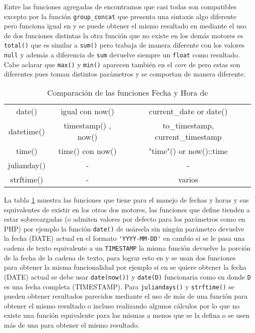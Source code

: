 Entre las funciones agregadas de \s encontramos que casi todas son compatibles excepto por la función \verb=group_concat= que presenta una sintaxis algo diferente pero funciona igual en \m y se puede obtener el mismo resultado en \p mediante el uso de dos funciones distintas la otra función que no existe en los demás motores es \verb=total()= que es similar a \verb=sum()= pero  trabaja de manera diferente con los valores \verb=null= y además a diferencia de \verb=sum= devuelve siempre un \verb=float= como resultado. Cabe aclarar que \verb=max()= y \verb=min()= aparecen también en el \textit{core} de \s pero estas son diferentes pues toman distintos parámetros y se comportan de manera diferente.

\begin{table}[h]
\begin{center}
{
\selectfont
\begin{tabular}{|c|c|c|}
\hline 
\s & \m & \p \\ 
\hline 
date() & igual con now() & current\_date or date() \\ 
\hline 
datetime() & timestamp() , now() & to\_timestamp, current\_timestamp \\ 
\hline 
time() & time() con now() & "time"() or now()::time \\ 
\hline 
julianday() & - & - \\ 
\hline 
strftime() & - & varios \\ 
\hline 
\end{tabular} 
}
\end{center}
\caption{Comparación de las funciones Fecha y Hora de \s}
\label{table:functions:dates}
\end{table}

La tabla \ref{table:functions:dates} muestra las funciones que tiene \s para el manejo de fechas y horas y sus equivalentes de existir en los otros dos motores, las funciones que define \s tienden a estar sobrecargadas (o admiten valores por defecto para los parámetros como en PHP) por ejemplo la función \verb=date()= de usársela sin ningún parámetro devuelve la fecha (DATE) actual en el formato \verb='YYYY-MM-DD'= en cambio si se le pasa una cadena de texto equivalente a un \verb=TIMESTAMP= la misma función devuelve la porción de la fecha de la cadena de texto, para lograr esto en \m y \p se usan dos funciones para obtener la misma funcionalidad por ejemplo si en \s se quiere obtener la fecha (DATE) actual se debe usar \verb=date(now())= y \verb=date(D)= funcionaria como en \s donde \verb=D= es una fecha completa (TIMESTAMP). Para \verb=juliandays()= y \verb=strftime()= se pueden obtener resultados parecidos mediante el uso de más de una función para obtener el mismo resultado o incluso realizando algunos cálculos por lo que no existe una función equivalente para las mismas a menos que se la defina o se usen  más de una para obtener el mismo resultado.

